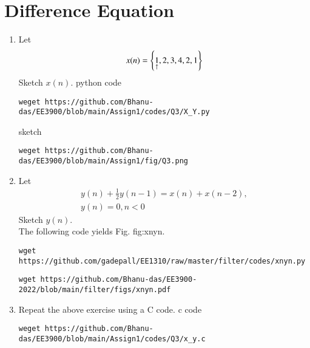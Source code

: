 \documentclass[journal,12pt,twocolumn]{IEEEtran}
\renewcommand\thesection{\arabic{section}}
\begin{document}
\section{Difference Equation}
\begin{enumerate}[label=\thesection.\arabic*,ref=\thesection.\theenumi]
\item Let
	\label{def:xn}
\begin{equation}
x(n) = \left\{\underset{\uparrow}{1},2,3,4,2,1\right\}
\end{equation}
Sketch $x(n)$.
\newline
\solution
python code
\begin{lstlisting}
weget https://github.com/Bhanu-das/EE3900/blob/main/Assign1/codes/Q3/X_Y.py
\end{lstlisting}
sketch
\begin{lstlisting}
weget https://github.com/Bhanu-das/EE3900/blob/main/Assign1/fig/Q3.png
\end{lstlisting}
\item Let
\begin{multline}
\label{eq:iir_filter}
y(n) + \frac{1}{2}y(n-1) = x(n) + x(n-2), 
\\
 y(n) = 0, n < 0
\end{multline}
Sketch $y(n)$.  
\\
\solution The following code yields Fig. {fig:xnyn}.
\begin{lstlisting}
wget https://github.com/gadepall/EE1310/raw/master/filter/codes/xnyn.py
\end{lstlisting}
\begin{lstlisting}
wget https://github.com/Bhanu-das/EE3900-2022/blob/main/filter/figs/xnyn.pdf
\end{lstlisting}

\item Repeat the above exercise using a C code.
\newline
\solution c code
\begin{lstlisting}
weget https://github.com/Bhanu-das/EE3900/blob/main/Assign1/codes/Q3/x_y.c
\end{lstlisting}
\end{enumerate}
\end{document}
